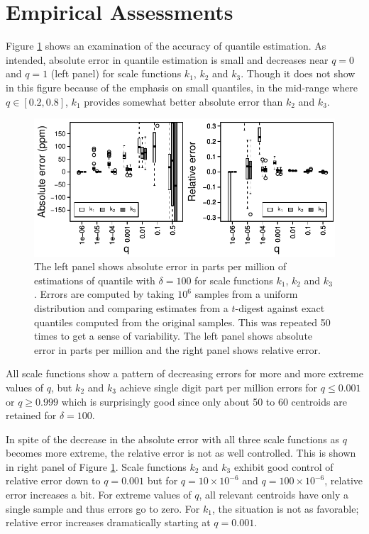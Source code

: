 \documentclass[11pt]{amsart}
\begin{document}
\section{Empirical Assessments}
Figure \ref{fig:by-scale} shows an examination of the accuracy of quantile estimation.  As intended, absolute error in quantile estimation is small and decreases near $q=0$ and $q=1$ (left panel) for scale functions $k_1$, $k_2$ and $k_3$. Though it does not show in this figure because of the emphasis on small quantiles, in the mid-range where $q \in [0.2, 0.8]$, $k_1$ provides somewhat better absolute error than $k_2$ and $k_3$. 
\begin{figure}[htb] %
   \includegraphics[width=5.5in]{relative-error.pdf} 
   \caption{The left panel shows absolute error in parts per million of estimations of quantile with $\delta = 100$ for scale functions $k_1$, $k_2$ and $k_3$. Errors are computed by taking $10^6$ samples from a uniform distribution and comparing estimates from a $t$-digest against exact quantiles computed from the original samples. This was repeated 50 times to get a sense of variability. The left panel shows absolute error in parts per million and the right panel shows relative error.}
   \label{fig:by-scale}
\end{figure}

All scale functions show a pattern of decreasing errors for more and more extreme values of $q$, but $k_2$ and $k_3$ achieve single digit part per million errors for $q\le 0.001$ or $q\ge0.999$ which is surprisingly good since only about 50 to 60 centroids are retained for $\delta=100$. 

In spite of the decrease in the absolute error with all three scale functions as $q$ becomes more extreme, the relative error is not as well controlled. This is shown in right panel of Figure \ref{fig:by-scale}. Scale functions $k_2$ and $k_3$ exhibit good control of relative error down to $q=0.001$ but for $q=10\times 10^{-6}$ and $q=100\times 10^{-6}$, relative error increases a bit. For  extreme values of $q$, all relevant centroids have only a single sample and thus errors go to zero. For $k_1$, the situation is not as favorable; relative error increases dramatically starting at $q=0.001$.
\end{document}
